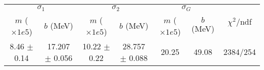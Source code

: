 \begin{tabular}{cc|cc|cc||c}
\multicolumn{2}{c|}{$\sigma_1$} & \multicolumn{2}{|c}{$\sigma_2$} & \multicolumn{2}{|c}{$\sigma_G$}  & \multirow{2}{*}{$\chi^2/$ndf}\\
$m$ ($\times1e5$) & $b$ (MeV) & $m$ ($\times1e5$) & $b$ (MeV) & $m$ ($\times1e5$) & $b$ (MeV) & \\
\hline
8.46 $\pm$ 0.14 & 17.207 $\pm$ 0.056 & 10.22 $\pm$ 0.22 & 28.757 $\pm$ 0.088 & 20.25 & 49.08 & 2384/254\\
\end{tabular}
